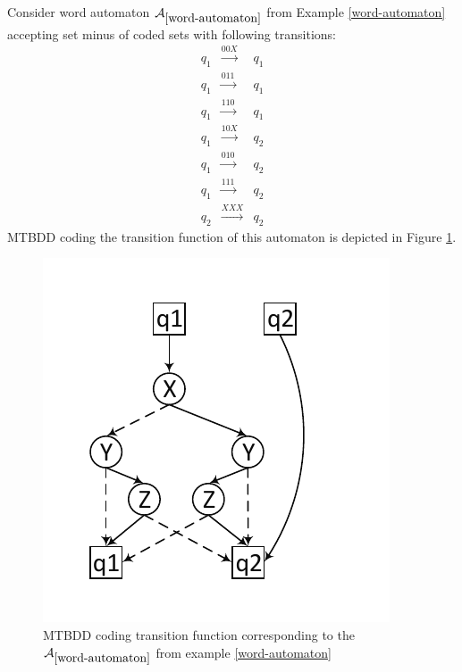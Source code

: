 \noindent\hrulefill
\begin{example}
 Consider word automaton $\mathcal{A}_{\ref{word-automaton}}$ from Example
 \ref{word-automaton} accepting set minus of coded sets with following transitions:
 \begin{eqnarray*}
  q_1 & \overset{00X}{\longrightarrow} & q_1\\
  q_1 & \overset{011}{\longrightarrow} & q_1\\
  q_1 & \overset{110}{\longrightarrow} & q_1\\
  q_1 & \overset{10X}{\longrightarrow} & q_2\\
  q_1 & \overset{010}{\longrightarrow} & q_2\\
  q_1 & \overset{111}{\longrightarrow} & q_2\\
  q_2 & \overset{XXX}{\longrightarrow} & q_2
 \end{eqnarray*}
  MTBDD coding the transition function of this automaton is depicted in Figure
  \ref{mtbdd}.
 
 \begin{figure}[h!]
  \begin{center}
   \includegraphics{fig/bdd-transition-function-encoding}
  \end{center}
  \caption{MTBDD coding transition function corresponding to the
  $\mathcal{A}_{\ref{word-automaton}}$ from example
  \ref{word-automaton}}\label{mtbdd}
 \end{figure}
 
\end{example}

